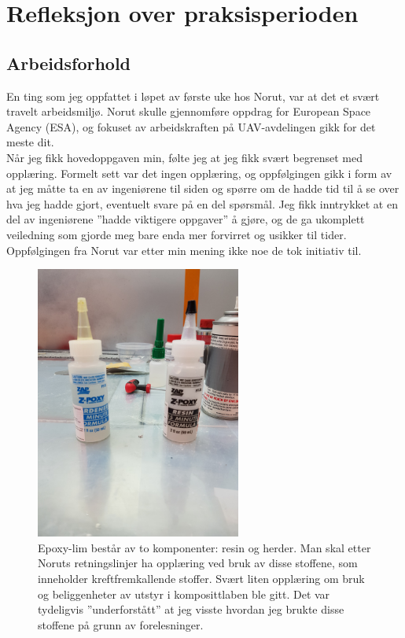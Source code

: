 \documentclass[12pt, a4paper]{report}
\begin{document}
\section{Refleksjon over praksisperioden}
\subsection{Arbeidsforhold}
En ting som jeg oppfattet i løpet av første uke hos Norut, var at det et svært travelt arbeidsmiljø. Norut skulle gjennomføre oppdrag for European Space Agency (ESA), og fokuset av arbeidskraften på UAV-avdelingen gikk for det meste dit.\\
Når jeg fikk hovedoppgaven min, følte jeg at jeg fikk svært begrenset med opplæring. Formelt sett var det ingen opplæring, og oppfølgingen gikk i form av at jeg måtte ta en av ingeniørene til siden og spørre om de hadde tid til å se over hva jeg hadde gjort, eventuelt svare på en del spørsmål. Jeg fikk inntrykket at en del av ingeniørene ''hadde viktigere oppgaver'' å gjøre, og de ga ukomplett veiledning som gjorde meg bare enda mer forvirret og usikker til tider. Oppfølgingen fra Norut var etter min mening ikke noe de tok initiativ til.\\

\begin{figure}[h]
	\centering
	\includegraphics[width = .6\textwidth, height=9cm]{bilder/epoxyresin.jpg}
	\caption{Epoxy-lim består av to komponenter: resin og herder. Man skal etter Noruts retningslinjer ha opplæring ved bruk av disse stoffene, som inneholder kreftfremkallende stoffer. Svært liten opplæring om bruk og beliggenheter av utstyr i komposittlaben ble gitt. Det var tydeligvis ''underforstått'' at jeg visste hvordan jeg brukte disse stoffene på grunn av forelesninger.}
\end{figure}
\end{document}
